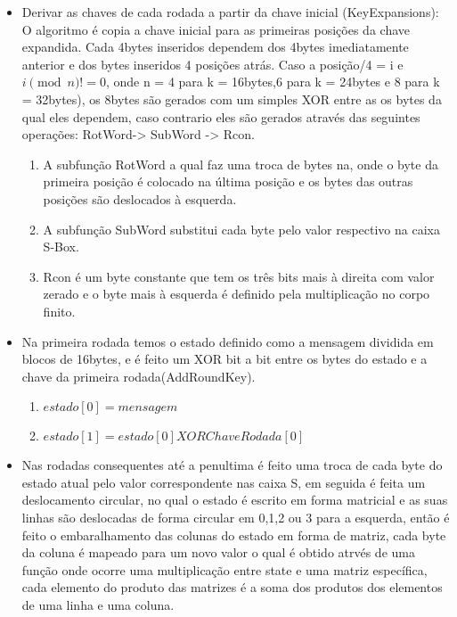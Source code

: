 \documentclass{article}
\begin{document}
\begin{itemize}

\item Derivar as chaves de cada rodada a partir da chave inicial (KeyExpansions): O algoritmo é copia a chave inicial para as primeiras posições da chave expandida. Cada 4bytes inseridos dependem dos 4bytes imediatamente anterior e dos bytes inseridos 4 posições atrás. Caso a posição/4 = i e $i \pmod{n} != 0$, onde n = 4 para k = 16bytes,6 para k = 24bytes e 8 para k = 32bytes), os 8bytes são gerados com um simples XOR entre as os bytes da qual eles dependem, caso contrario eles são gerados através das seguintes operações: RotWord-> SubWord -> Rcon. 
    \begin{enumerate}
    \item A subfunção RotWord a qual faz uma troca de bytes na, onde o byte da primeira posição é colocado na última posição e os bytes das outras posições são deslocados à esquerda. 
    \item A subfunção SubWord substitui cada byte pelo valor respectivo na caixa S-Box. 
    \item Rcon é um byte constante que tem os três bits mais à direita com valor zerado e o byte mais à esquerda é definido pela multiplicação no corpo finito.
    \end{enumerate} 

\item Na primeira rodada temos o estado definido como a mensagem dividida em blocos de 16bytes, e é feito um XOR bit a bit entre os bytes do estado e a chave da primeira rodada(AddRoundKey).
    \begin{enumerate}
        \item $estado[0] = mensagem$
        \item $estado[1] = estado[0] XOR ChaveRodada[0]$
    \end{enumerate}

\item Nas rodadas consequentes até a penultima é feito uma troca de cada byte do estado atual pelo valor correspondente nas caixa S, em seguida é feita um deslocamento circular, no qual o estado é escrito em forma matricial e as suas linhas são deslocadas de forma circular em 0,1,2 ou 3 para a esquerda, então é feito o embaralhamento das colunas do estado em forma de matriz, cada byte da coluna é mapeado para um novo valor o qual é obtido atrvés de uma função onde ocorre uma multiplicação entre state e uma matriz específica, cada elemento do produto das matrizes é a soma dos produtos dos elementos de uma linha e uma coluna.



\end{itemize}
\end{document}
